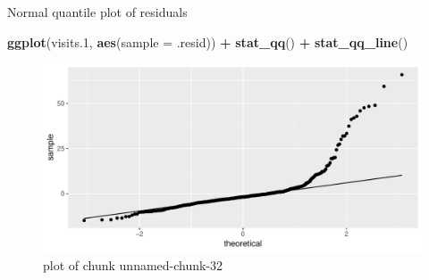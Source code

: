 \documentclass[ignorenonframetext,]{beamer}
\newenvironment{Shaded}{\begin{snugshade}}{\end{snugshade}}
\newcommand{\DataTypeTok}[1]{\textcolor[rgb]{0.13,0.29,0.53}{#1}}
\newcommand{\FloatTok}[1]{\textcolor[rgb]{0.00,0.00,0.81}{#1}}
\newcommand{\KeywordTok}[1]{\textcolor[rgb]{0.13,0.29,0.53}{\textbf{#1}}}
\newcommand{\NormalTok}[1]{#1}
\newcommand{\OperatorTok}[1]{\textcolor[rgb]{0.81,0.36,0.00}{\textbf{#1}}}
\newcommand{\StringTok}[1]{\textcolor[rgb]{0.31,0.60,0.02}{#1}}
\begin{document}
\begin{frame}[fragile]{Normal quantile plot of residuals}
\protect\hypertarget{normal-quantile-plot-of-residuals}{}

\begin{Shaded}
\begin{Highlighting}[]
\KeywordTok{ggplot}\NormalTok{(visits}\FloatTok{.1}\NormalTok{, }\KeywordTok{aes}\NormalTok{(}\DataTypeTok{sample =}\NormalTok{ .resid)) }\OperatorTok{+}\StringTok{ }\KeywordTok{stat_qq}\NormalTok{() }\OperatorTok{+}\StringTok{ }\KeywordTok{stat_qq_line}\NormalTok{()}
\end{Highlighting}
\end{Shaded}

\begin{figure}
\centering
\includegraphics{figure/unnamed-chunk-32-1.pdf}
\caption{plot of chunk unnamed-chunk-32}
\end{figure}

\end{frame}
\end{document}
